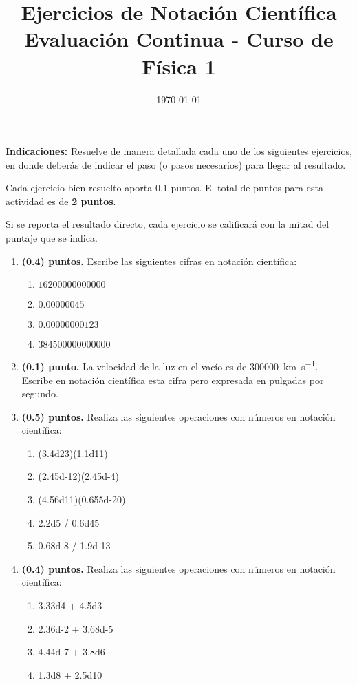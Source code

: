 \documentclass[14pt]{extarticle}
\title{\vspace*{-2cm} Ejercicios de Notación Científica \\  Evaluación Continua - Curso de Física 1\vspace{-5ex}}
\date{\today}
\begin{document}
\maketitle

\textbf{Indicaciones:} Resuelve de manera detallada cada uno de los siguientes ejercicios, en donde deberás de indicar el paso (o pasos necesarios) para llegar al resultado.

Cada ejercicio bien resuelto aporta $0.1$ puntos. El total de puntos para esta actividad es de \textbf{2 puntos}.

Si se reporta el resultado directo, cada ejercicio se calificará con la mitad del puntaje que se indica.

\begin{enumerate}
\item \textbf{(0.4) puntos.} Escribe las siguientes cifras en notación científica:
\begin{enumerate}
\item $16200000000000$
\item $0.00000045$
\item $0.00000000123$
\item $384500000000000$
\end{enumerate}
\item \textbf{(0.1) punto.} La velocidad de la luz en el vacío es de \SI{300000}{\kilo\meter\per\second}. Escribe en notación científica esta cifra pero expresada en pulgadas por segundo.
\item \textbf{(0.5) puntos.} Realiza las siguientes operaciones con números en notación científica:
\begin{enumerate}
    \item (\num{3.4d23})(\num{1.1d11})
    \item (\num{2.45d-12})(\num{2.45d-4})
    \item (\num{4.56d11})(\num{0.655d-20})
    \item \num{2.2d5} / \num{0.6d45}
    \item \num{0.68d-8} / \num{1.9d-13}
\end{enumerate}
\item \textbf{(0.4) puntos.} Realiza las siguientes operaciones con números en notación científica:
\begin{enumerate}
    \item \num{3.33d4} + \num{4.5d3}
    \item \num{2.36d-2} + \num{3.68d-5}
    \item \num{4.44d-7} + \num{3.8d6}
    \item \num{1.3d8} + \num{2.5d10}

\end{enumerate}
\end{enumerate}
\end{document}
